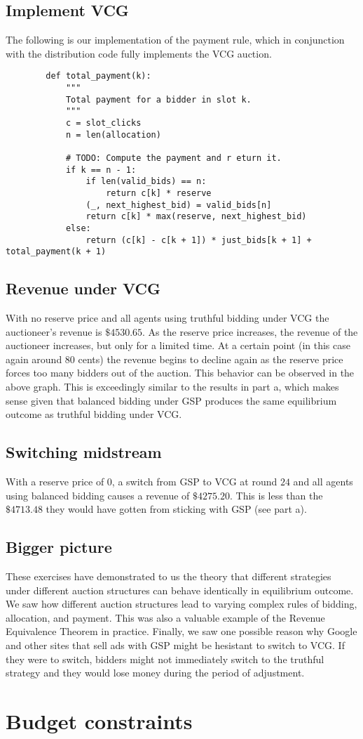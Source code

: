 \documentclass[11pt]{article}
\begin{document}
\subsection{Implement VCG}
The following is our implementation of the payment rule, which in conjunction with the distribution code fully implements the VCG auction.
\begin{verbatim}
        def total_payment(k):
            """
            Total payment for a bidder in slot k.
            """
            c = slot_clicks
            n = len(allocation)

            # TODO: Compute the payment and r eturn it.
            if k == n - 1:
                if len(valid_bids) == n:
                    return c[k] * reserve
                (_, next_highest_bid) = valid_bids[n]
                return c[k] * max(reserve, next_highest_bid)
            else:
                return (c[k] - c[k + 1]) * just_bids[k + 1] + total_payment(k + 1)
\end{verbatim}
\subsection{Revenue under VCG}
With no reserve price and all agents using truthful bidding under VCG the auctioneer's revenue is $\$4530.65$. As the reserve price increases, the revenue of the auctioneer increases, but only for a limited time. At a certain point (in this case again around $80$ cents) the revenue begins to decline again as the reserve price forces too many bidders out of the auction. This behavior can be observed in the above graph. This is exceedingly similar to the results in part a, which makes sense given that balanced bidding under GSP produces the same equilibrium outcome as truthful bidding under VCG.
\subsection{Switching midstream}
With a reserve price of $0$, a switch from GSP to VCG at round $24$ and all agents using balanced bidding causes a revenue of $\$4275.20$. This is less than the $\$4713.48$ they would have gotten from sticking with GSP (see part a).
\subsection{Bigger picture}
These exercises have demonstrated to us the theory that different strategies under different auction structures can behave identically in equilibrium outcome. We saw how different auction structures lead to varying complex rules of bidding, allocation, and payment. This was also a valuable example of the Revenue Equivalence Theorem in practice. Finally, we saw one possible reason why Google and other sites that sell ads with GSP might be hesistant to switch to VCG. If they were to switch, bidders might not immediately switch to the truthful strategy and they would lose money during the period of adjustment.   


\section{Budget constraints}
\end{document}
